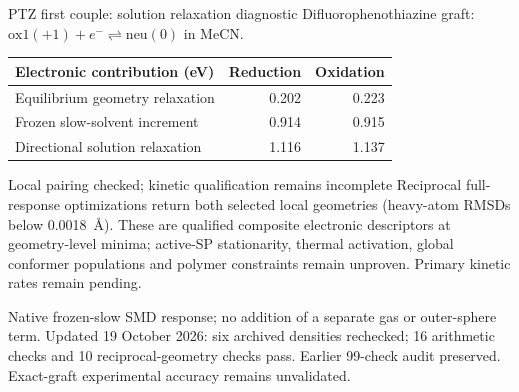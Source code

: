 \begin{frame}{PTZ first couple: solution relaxation diagnostic}
\small
Difluorophenothiazine graft: $\mathrm{ox1}(+1) + e^- \rightleftharpoons \mathrm{neu}(0)$ in MeCN.
\medskip\par\centering
\begin{tabular}{lrr}
\toprule
Electronic contribution (eV) & Reduction & Oxidation \\
\midrule
Equilibrium geometry relaxation & 0.202 & 0.223 \\
Frozen slow-solvent increment & 0.914 & 0.915 \\
Directional solution relaxation & 1.116 & 1.137 \\
\bottomrule
\end{tabular}\par\raggedright
\medskip
\begin{block}{Local pairing checked; kinetic qualification remains incomplete}
Reciprocal full-response optimizations return both selected local geometries
(heavy-atom RMSDs below 0.0018~\AA). These are qualified composite electronic
descriptors at geometry-level minima; active-SP stationarity, thermal activation,
global conformer populations and polymer constraints remain unproven.
Primary kinetic rates remain pending.
\end{block}
\footnotesize Native frozen-slow SMD response; no addition of a separate gas or outer-sphere term.
\vfill\scriptsize Updated 19 October 2026: six archived densities rechecked; 16 arithmetic checks
and 10 reciprocal-geometry checks pass. Earlier 99-check audit preserved.
Exact-graft experimental accuracy remains unvalidated.
\end{frame}
